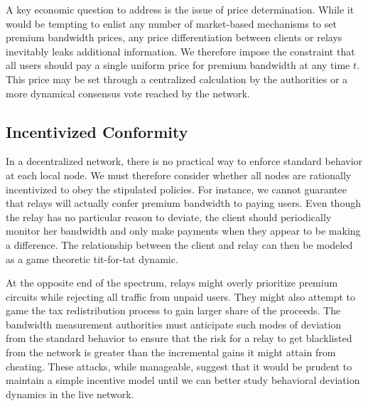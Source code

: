 A key economic question to address is the issue of price determination. While it
would be tempting to enlist any number of market-based mechanisms to set premium
bandwidth prices, any price differentiation between clients or relays inevitably
leaks additional information. We therefore impose the constraint that all users
should pay a single uniform price for premium bandwidth at any time $t$. This
price may be set through a centralized calculation by the authorities or a more
dynamical consensus vote reached by the network.

\subsection{Incentivized Conformity} In a decentralized network, there is no
practical way to enforce standard behavior at each local node. We must therefore
consider whether all nodes are rationally incentivized to obey the stipulated
policies. For instance, we cannot guarantee that relays will actually confer
premium bandwidth to paying users. Even though the relay has no particular
reason to deviate, the client should periodically monitor her bandwidth and only
make payments when they appear to be making a difference. The relationship
between the client and relay can then be modeled as a game theoretic tit-for-tat
dynamic.

At the opposite end of the spectrum, relays might overly prioritize premium
circuits while rejecting all traffic from unpaid users. They might also attempt
to game the tax redistribution process to gain larger share of the proceeds. The
bandwidth measurement authorities must anticipate such modes of deviation from
the standard behavior to ensure that the risk for a relay to get blacklisted
from the network is greater than the incremental gains it might attain from
cheating. These attacks, while manageable, suggest that it would be prudent to
maintain a simple incentive model until we can better study behavioral deviation
dynamics in the live network.